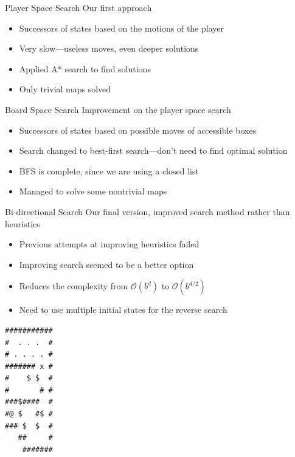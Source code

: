 \documentclass{beamer}
\begin{document}
\begin{frame}{Player Space Search}
  Our first approach
  \begin{itemize}
  \item Successors of states based on the motions of the player
  \item Very slow---useless moves, even deeper solutions
  \item Applied A* search to find solutions
  \item Only trivial maps solved
  \end{itemize}
\end{frame}

\begin{frame}{Board Space Search}
  Improvement on the player space search
  \begin{itemize}
  \item Successors of states based on possible moves of accessible boxes
  \item Search changed to best-first search---don't need to find optimal solution
  \item BFS is complete, since we are using a closed list
  \item Managed to solve some nontrivial maps
  \end{itemize}
\end{frame}

\begin{frame}{Bi-directional Search}
  Our final version, improved search method rather than heuristics
  \begin{itemize}
  \item Previous attempts at improving heuristics failed
  \item Improving search seemed to be a better option
  \item Reduces the complexity from $\mathcal{O}(b^d)$ to $\mathcal{O}(b^{d/2})$
  \item Need to use multiple initial states for the reverse search
  \end{itemize}
\end{frame}

\begin{lrbox}{\mapff}
  \begin{minipage}{.25\textwidth}
\centering
\begin{BVerbatim}
###########
#  . . .  #
# . . . . #
####### x #
#    $ $  #
#       # #
###$####  #
#@ $   #$ #
### $  $  #
   ##     #
    #######  
\end{BVerbatim}
  \end{minipage}
\end{lrbox}%
\end{document}
